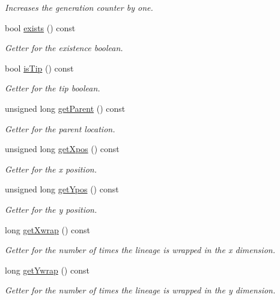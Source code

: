 \begin{DoxyCompactItemize}
\begin{DoxyCompactList}\small\item\em Increases the generation counter by one. \end{DoxyCompactList}\item 
bool \hyperlink{class_tree_node_adca5ccf0cada63221a813cc72ec453de}{exists} () const 
\begin{DoxyCompactList}\small\item\em Getter for the existence boolean. \end{DoxyCompactList}\item 
bool \hyperlink{class_tree_node_a92cce5b08cb7b5144d53d6efd444a54e}{is\+Tip} () const 
\begin{DoxyCompactList}\small\item\em Getter for the tip boolean. \end{DoxyCompactList}\item 
unsigned long \hyperlink{class_tree_node_aad17624440cf0b1739d56e48bc142d75}{get\+Parent} () const 
\begin{DoxyCompactList}\small\item\em Getter for the parent location. \end{DoxyCompactList}\item 
unsigned long \hyperlink{class_tree_node_adf06aee733e652bff48553e0e598737f}{get\+Xpos} () const 
\begin{DoxyCompactList}\small\item\em Getter for the x position. \end{DoxyCompactList}\item 
unsigned long \hyperlink{class_tree_node_a53e792c35abe0860f2277aeeca17022d}{get\+Ypos} () const 
\begin{DoxyCompactList}\small\item\em Getter for the y position. \end{DoxyCompactList}\item 
long \hyperlink{class_tree_node_abf66032cab0e8a7583471e941991d252}{get\+Xwrap} () const 
\begin{DoxyCompactList}\small\item\em Getter for the number of times the lineage is wrapped in the x dimension. \end{DoxyCompactList}\item 
long \hyperlink{class_tree_node_a5b7ed0a3f729faea52fdc96b22977384}{get\+Ywrap} () const 
\begin{DoxyCompactList}\small\item\em Getter for the number of times the lineage is wrapped in the y dimension. \end{DoxyCompactList}\item 

\end{DoxyCompactItemize}
